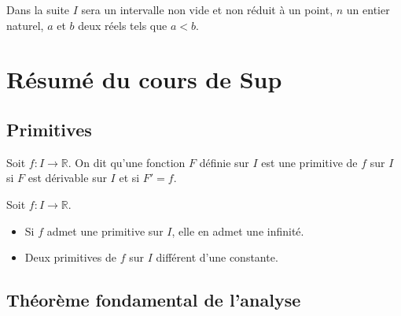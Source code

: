 \documentclass[french,11pt,twoside]{VcCours}
\begin{document}

\tableofcontents
\separationTitre

Dans la suite $I$ sera un intervalle non vide et non réduit à un point, $n$ un entier naturel, $a$ et $b$ deux réels tels que $a<b$.

\section{Résumé du cours de Sup}
 
\subsection{Primitives}
 
\begin{Definition}{} Soit $f : I \rightarrow \mathbb{R}$. On dit qu'une fonction $F$ définie sur $I$ est une primitive de $f$ sur $I$ si $F$ est dérivable sur $I$ et si $F'=f$.
\end{Definition}

\begin{Proposition}{} Soit $f : I \rightarrow \mathbb{R}$.

\begin{itemize}
\item Si $f$ admet une primitive sur $I$, elle en admet une infinité.
\item Deux primitives de $f$ sur $I$ différent d'une constante.
\end{itemize}
\end{Proposition}

%

\subsection{Théorème fondamental de l'analyse}
\end{document}
